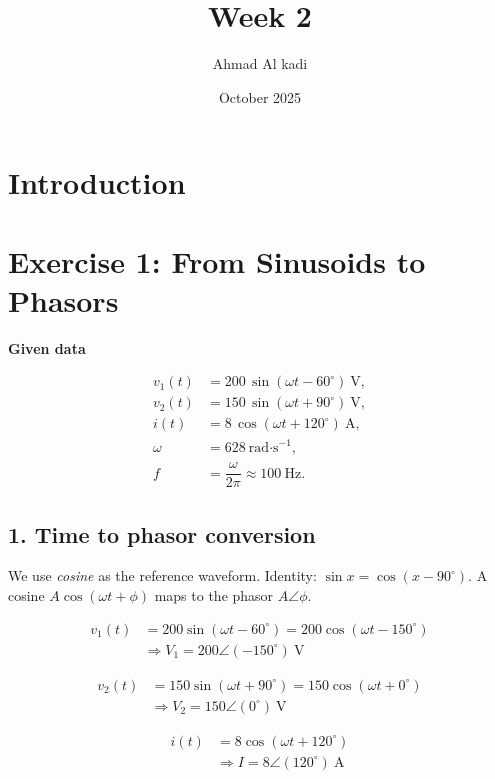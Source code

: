 \documentclass{article}
\title{Week 2}
\author{Ahmad Al kadi}
\date{October 2025}
\begin{document}
\maketitle

\section{Introduction}



\section*{Exercise 1: From Sinusoids to Phasors \quad }

\textbf{Given data}

\[
\begin{aligned}
v_{1}(t) &= 200\,\sin(\omega t-60^\circ)\ \text{V},\\
v_{2}(t) &= 150\,\sin(\omega t+90^\circ)\ \text{V},\\
i(t)     &= 8\,\cos(\omega t+120^\circ)\ \text{A},\\
\omega   &= 628\ \text{rad·s}^{-1},\\
f        &= \dfrac{\omega}{2\pi}\approx 100\ \text{Hz}.
\end{aligned}
\]


\subsection*{1. Time to phasor conversion}

We use \emph{cosine} as the reference waveform.  
Identity: \(\sin x=\cos(x-90^\circ)\).  
A cosine \(A\cos(\omega t+\phi)\) maps to the phasor \(A\angle\phi\).

\[
\begin{aligned}
v_1(t) &= 200\sin(\omega t-60^\circ)
       = 200\cos(\omega t-150^\circ)\\
       &\Rightarrow V_1 = 200\angle(-150^\circ)\ \text{V}
\end{aligned}
\]

\[
\begin{aligned}
v_2(t) &= 150\sin(\omega t+90^\circ)
       = 150\cos(\omega t+0^\circ)\\
       &\Rightarrow V_2 = 150\angle(0^\circ)\ \text{V}
\end{aligned}
\]

\[
\begin{aligned}
i(t) &= 8\cos(\omega t+120^\circ)\\
     &\Rightarrow I = 8\angle(120^\circ)\ \text{A}
\end{aligned}
\]
\end{document}
